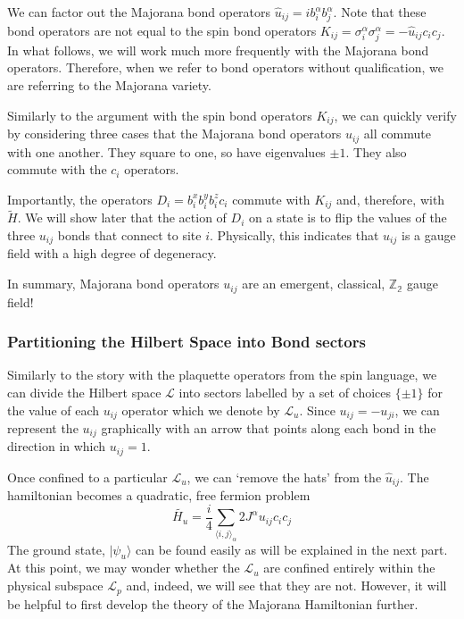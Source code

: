 We can factor out the Majorana bond operators \(\hat{u}_{ij} = i b^\alpha_i b^\alpha_j\). Note that these bond operators are not equal to the spin bond operators \(K_{ij} = \sigma^\alpha_i \sigma^\alpha_j = - \hat{u}_{ij} c_i c_j\). In what follows, we will work much more frequently with the Majorana bond operators. Therefore, when we refer to bond operators without qualification, we are referring to the Majorana variety.

Similarly to the argument with the spin bond operators \(K_{ij}\), we can quickly verify by considering three cases that the Majorana bond operators \(u_{ij}\) all commute with one another. They square to one, so have eigenvalues \(\pm 1\). They also commute with the \(c_i\) operators.

Importantly, the operators \(D_i = b^x_i b^y_i b^z_i c_i\) commute with \(K_{ij}\) and, therefore, with \(\tilde{H}\). We will show later that the action of \(D_i\) on a state is to flip the values of the three \(u_{ij}\) bonds that connect to site \(i\). Physically, this indicates that \(u_{ij}\) is a gauge field with a high degree of degeneracy.

In summary, Majorana bond operators \(u_{ij}\) are an emergent, classical, \(\mathbb{Z_2}\) gauge field!

\hypertarget{partitioning-the-hilbert-space-into-bond-sectors}{%
\subsubsection{Partitioning the Hilbert Space into Bond sectors}\label{partitioning-the-hilbert-space-into-bond-sectors}}

Similarly to the story with the plaquette operators from the spin language, we can divide the Hilbert space \(\mathcal{L}\) into sectors labelled by a set of choices \(\{\pm 1\}\) for the value of each \(u_{ij}\) operator which we denote by \(\mathcal{L}_u\). Since \(u_{ij} = -u_{ji}\), we can represent the \(u_{ij}\) graphically with an arrow that points along each bond in the direction in which \(u_{ij} = 1\).

Once confined to a particular \(\mathcal{L}_u\), we can `remove the hats' from the \(\hat{u}_{ij}\). The hamiltonian becomes a quadratic, free fermion problem \[\tilde{H_u} =  \frac{i}{4} \sum_{\langle i,j\rangle_\alpha} 2J^{\alpha} u_{ij} c_i c_j\] The ground state, \(|\psi_u\rangle\) can be found easily as will be explained in the next part. At this point, we may wonder whether the \(\mathcal{L}_u\) are confined entirely within the physical subspace \(\mathcal{L}_p\) and, indeed, we will see that they are not. However, it will be helpful to first develop the theory of the Majorana Hamiltonian further.

